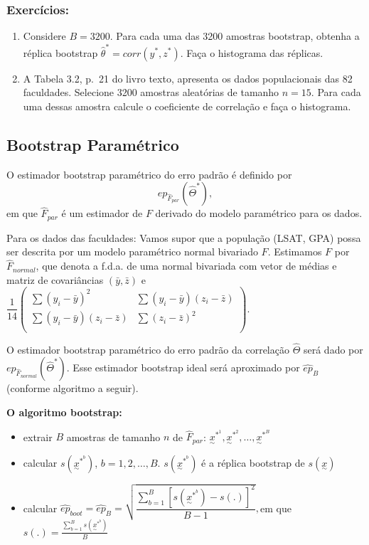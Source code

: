 \documentclass[
  letterpaper,
  DIV=11,
  numbers=noendperiod]{scrreprt}
\providecommand{\tightlist}{%
  \setlength{\itemsep}{0pt}\setlength{\parskip}{0pt}}\usepackage{longtable,booktabs,array}
\begin{document}
\subsubsection{Exercícios:}\label{exercuxedcios-3}

\begin{enumerate}
\def\labelenumi{(\arabic{enumi})}
\item
  Considere \(B = 3200\). Para cada uma das 3200 amostras bootstrap,
  obtenha a réplica bootstrap \(\hat{\theta}^*=corr(y^*,z^*)\). Faça o
  histograma das réplicas.
\item
  A Tabela 3.2, p.~21 do livro texto, apresenta os dados populacionais
  das 82 faculdades. Selecione 3200 amostras aleatórias de tamanho
  \(n = 15\). Para cada uma dessas amostra calcule o coeficiente de
  correlação e faça o histograma.
\end{enumerate}

\subsection{Bootstrap Paramétrico}\label{bootstrap-paramuxe9trico}

O estimador bootstrap paramétrico do erro padrão é definido por
\[ep_{\hat{F}_{par}}(\hat\Theta^*),\] em que \(\hat{F}_{par}\) é um
estimador de \(F\) derivado do modelo paramétrico para os dados.

Para os dados das faculdades: Vamos supor que a população (LSAT, GPA)
possa ser descrita por um modelo paramétrico normal bivariado \(F\).
Estimamos \(F\) por \(\hat{F}_{normal}\), que denota a f.d.a. de uma
normal bivariada com vetor de médias e matriz de covariâncias
\((\bar{y},\bar{z})\) e \(\dfrac{1}{14}\left(
\begin{array}{ll}
\sum(y_i-\bar{y})^2            &  \sum(y_i-\bar{y})(z_i-\bar{z}) \\
\sum(y_i-\bar{y})(z_i-\bar{z}) &  \sum(z_i-\bar{z})^2  \\
\end{array}
\right)\).

O estimador bootstrap paramétrico do erro padrão da correlação
\(\hat{\Theta}\) será dado por \(ep_{\hat{F}_{normal}}(\hat\Theta^*)\).
Esse estimador bootstrap ideal será aproximado por \(\hat{ep}_{B}\)
(conforme algoritmo a seguir).

\textbf{O algoritmo bootstrap:}

\begin{itemize}
\tightlist
\item
  extrair \(B\) amostras de tamanho \(n\) de \(\hat{F}_{par}\):
  \(\underset{\sim}{x}^{*^{1}}, \underset{\sim}{x}^{*^{2}}, \ldots, \underset{\sim}{x}^{*^{B}}\)
\item
  calcular \(s(\underset{\sim}{x}^{*^{b}})\), \(b=1, 2, \ldots, B\).
  \(s(\underset{\sim}{x}^{*^{b}})\) é a réplica bootstrap de
  \(s(\underset{\sim}{x})\)
\item
  calcular
  \(\hat{ep}_{boot}=\hat{ep}_{B}=\sqrt{ \dfrac{\sum_{b=1}^{B}[s(\underset{\sim}{x}^{*^{b}})-s(.)]^2}{B-1}},\)em
  que \(s(.)=\frac{\sum_{b=1}^{B}s(\underset{\sim}{x}^{*^{b}})}{B}\)
\end{itemize}
\end{document}
